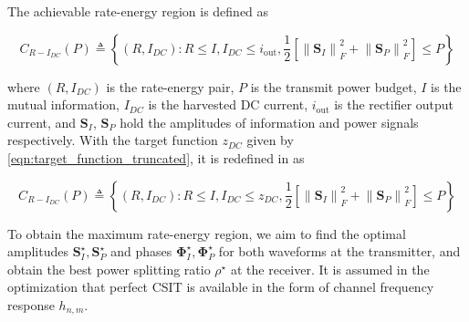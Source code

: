 The achievable rate-energy region is defined as

\begin{equation}\label{eqn:rate_energy_region}
  {C_{R - {I_{DC}}}}(P) \triangleq \left\{ {\left( {R,{I_{DC}}} \right):R \leqslant I,{I_{DC}} \leqslant {i_{{\text{out}}}},\frac{1}{2}\left[ {\left\| {{{\mathbf{S}}_I}} \right\|_F^2 + \left\| {{{\mathbf{S}}_P}} \right\|_F^2} \right] \leqslant P} \right\}
\end{equation}

where ${\left( {R,{I_{DC}}} \right)}$ is the rate-energy pair, $P$ is the transmit power budget, $I$ is the mutual information, ${{I_{DC}}}$ is the harvested DC current, ${{i_{{\text{out}}}}}$ is the rectifier output current, and ${{{\mathbf{S}}_I}}$, ${{{\mathbf{S}}_P}}$ hold the amplitudes of information and power signals respectively. With the target function ${{z_{DC}}}$ given by \ref{eqn:target_function_truncated}, it is redefined in \cite{Clerckx2018} as

\begin{equation}\label{eqn:rate_energy_region_redefined}
  {C_{R - {I_{DC}}}}(P) \triangleq \left\{ {\left( {R,{I_{DC}}} \right):R \leqslant I,{I_{DC}} \leqslant {z_{DC}},\frac{1}{2}\left[ {\left\| {{{\mathbf{S}}_I}} \right\|_F^2 + \left\| {{{\mathbf{S}}_P}} \right\|_F^2} \right] \leqslant P} \right\}
\end{equation}

To obtain the maximum rate-energy region, we aim to find the optimal amplitudes ${\mathbf{S}}_I^ \star ,{\mathbf{S}}_P^ \star $ and phases ${\mathbf{\Phi }}_I^ \star ,{\mathbf{\Phi }}_P^ \star $ for both waveforms at the transmitter, and obtain the best power splitting ratio ${\rho ^ \star }$ at the receiver. It is assumed in the optimization that perfect CSIT is available in the form of channel frequency response ${h_{n,m}}$.
